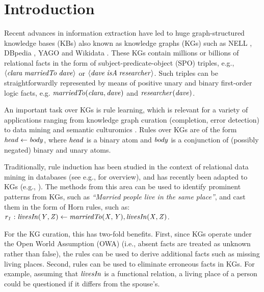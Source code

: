 \section{Introduction}
\label{sec:intro}

Recent advances in information extraction have led to
huge graph-structured knowledge bases (KBs) also known as knowledge graphs (KGs) such as NELL \cite{nell}, DBpedia \cite{dbpedia}, YAGO \cite{yago} and Wikidata \cite{wikidata}. These KGs contain millions or billions of relational facts in the form of subject-predicate-object (SPO) triples, e.g., $\langle\mathit{clara\;marriedTo\;dave}\rangle$ or $\langle\mathit{dave\;isA\;researcher}\rangle$. Such triples can be straightforwardly represented by means of positive unary and binary first-order logic facts, e.g. $\mathit{marriedTo(clara,dave)}$ and $\mathit{researcher(dave)}$.

An important task over KGs is rule learning, which is relevant for a variety of applications ranging from knowledge graph curation (completion, error detection) \cite{DBLP:journals/semweb/Paulheim17} to data mining and semantic culturomics \cite{suchanek2014semantic}. Rules over KGs are of the form $\mathit{head \leftarrow body}$, where $\mathit{head}$ is a binary atom and $\mathit{body}$ is a conjunction of (possibly negated) binary and unary atoms. 

Traditionally, rule induction has been studied in the context of relational data mining in databases (see e.g., \cite{DBLP:books/daglib/0021868} for overview), and has recently been adapted to KGs (e.g., \cite{amie,op,rdf2rules}). The methods from this area can be used to identify prominent patterns from KGs, such as \emph{``Married people live in the same
place''}, and cast them in the form of Horn rules, such as:
$\mathit{r_1:\;}\mathit{livesIn(Y,Z)}\leftarrow \mathit{marriedTo(X,Y),livesIn(X,Z)}$. 

For the KG curation, this has two-fold benefits. First, since KGs operate under the Open World
Assumption (OWA) (i.e., absent facts are treated as unknown rather than false),
the rules can be used to derive additional facts such as missing living places. %
Second, rules can be used to eliminate erroneous facts in KGs. For example, assuming that $\mathit{livesIn}$ is a functional relation, %
a living place of a person could be questioned if it differs from the spouse's.

